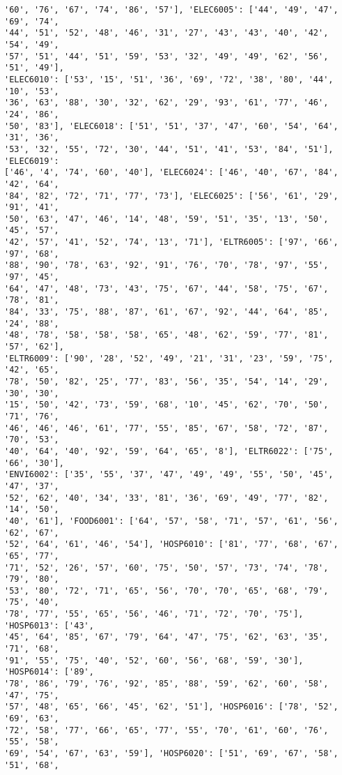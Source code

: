 \documentclass[11pt]{article}
\begin{document}
\begin{Verbatim}[commandchars=\\\{\}]
'60', '76', '67', '74', '86', '57'], 'ELEC6005': ['44', '49', '47', '69', '74',
'44', '51', '52', '48', '46', '31', '27', '43', '43', '40', '42', '54', '49',
'57', '51', '44', '51', '59', '53', '32', '49', '49', '62', '56', '51', '49'],
'ELEC6010': ['53', '15', '51', '36', '69', '72', '38', '80', '44', '10', '53',
'36', '63', '88', '30', '32', '62', '29', '93', '61', '77', '46', '24', '86',
'50', '83'], 'ELEC6018': ['51', '51', '37', '47', '60', '54', '64', '31', '36',
'53', '32', '55', '72', '30', '44', '51', '41', '53', '84', '51'], 'ELEC6019':
['46', '4', '74', '60', '40'], 'ELEC6024': ['46', '40', '67', '84', '42', '64',
'84', '82', '72', '71', '77', '73'], 'ELEC6025': ['56', '61', '29', '91', '41',
'50', '63', '47', '46', '14', '48', '59', '51', '35', '13', '50', '45', '57',
'42', '57', '41', '52', '74', '13', '71'], 'ELTR6005': ['97', '66', '97', '68',
'88', '90', '78', '63', '92', '91', '76', '70', '78', '97', '55', '97', '45',
'64', '47', '48', '73', '43', '75', '67', '44', '58', '75', '67', '78', '81',
'84', '33', '75', '88', '87', '61', '67', '92', '44', '64', '85', '24', '88',
'48', '78', '58', '58', '58', '65', '48', '62', '59', '77', '81', '57', '62'],
'ELTR6009': ['90', '28', '52', '49', '21', '31', '23', '59', '75', '42', '65',
'78', '50', '82', '25', '77', '83', '56', '35', '54', '14', '29', '30', '30',
'15', '50', '42', '73', '59', '68', '10', '45', '62', '70', '50', '71', '76',
'46', '46', '46', '61', '77', '55', '85', '67', '58', '72', '87', '70', '53',
'40', '64', '40', '92', '59', '64', '65', '8'], 'ELTR6022': ['75', '66', '30'],
'ENVI6002': ['35', '55', '37', '47', '49', '49', '55', '50', '45', '47', '37',
'52', '62', '40', '34', '33', '81', '36', '69', '49', '77', '82', '14', '50',
'40', '61'], 'FOOD6001': ['64', '57', '58', '71', '57', '61', '56', '62', '67',
'52', '64', '61', '46', '54'], 'HOSP6010': ['81', '77', '68', '67', '65', '77',
'71', '52', '26', '57', '60', '75', '50', '57', '73', '74', '78', '79', '80',
'53', '80', '72', '71', '65', '56', '70', '70', '65', '68', '79', '75', '40',
'78', '77', '55', '65', '56', '46', '71', '72', '70', '75'], 'HOSP6013': ['43',
'45', '64', '85', '67', '79', '64', '47', '75', '62', '63', '35', '71', '68',
'91', '55', '75', '40', '52', '60', '56', '68', '59', '30'], 'HOSP6014': ['89',
'78', '86', '79', '76', '92', '85', '88', '59', '62', '60', '58', '47', '75',
'57', '48', '65', '66', '45', '62', '51'], 'HOSP6016': ['78', '52', '69', '63',
'72', '58', '77', '66', '65', '77', '55', '70', '61', '60', '76', '55', '58',
'69', '54', '67', '63', '59'], 'HOSP6020': ['51', '69', '67', '58', '51', '68',

\end{Verbatim}
\end{document}
